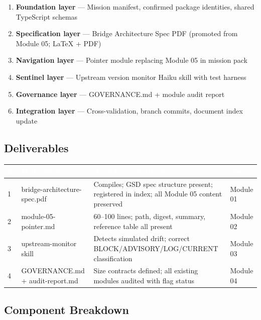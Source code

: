 \documentclass[11pt,letterpaper]{article}
\newcommand{\tableheader}[1]{\textbf{\sffamily\textcolor{white}{#1}}}
\begin{document}
\begin{enumerate}[noitemsep]
  \item \textbf{Foundation layer} --- Mission manifest, confirmed package identities, shared TypeScript schemas
  \item \textbf{Specification layer} --- Bridge Architecture Spec PDF (promoted from Module 05; LaTeX + PDF)
  \item \textbf{Navigation layer} --- Pointer module replacing Module 05 in mission pack
  \item \textbf{Sentinel layer} --- Upstream version monitor Haiku skill with test harness
  \item \textbf{Governance layer} --- GOVERNANCE.md + module audit report
  \item \textbf{Integration layer} --- Cross-validation, branch commits, document index update
\end{enumerate}

\subsection{Deliverables}

\begin{center}
\begin{tabularx}{\textwidth}{C{0.5cm}L{4.5cm}L{3.5cm}L{2.5cm}}
\toprule
{}
\tableheader{\#} & \tableheader{Deliverable} & \tableheader{Acceptance Criteria} & \tableheader{Spec} \\
 & bridge-architecture-spec.pdf & Compiles; GSD spec structure present; registered in index; all Module 05 content preserved & Module 01 \\
2 & module-05-pointer.md & 60--100 lines; path, digest, summary, reference table all present & Module 02 \\
3 & upstream-monitor skill & Detects simulated drift; correct BLOCK/ADVISORY/LOG/CURRENT classification & Module 03 \\
4 & GOVERNANCE.md + audit-report.md & Size contracts defined; all existing modules audited with flag status & Module 04 \\
\bottomrule
\end{tabularx}
\end{center}

\subsection{Component Breakdown}
\end{document}
